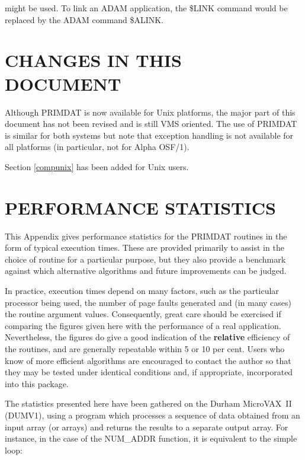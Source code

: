 \documentclass[11pt,nolof]{starlink}
\providecommand{\name}[1]{\mbox{#1}}
\begin{document}

might be used.
To link an \name{ADAM} application, the \name{\$LINK} command would be
replaced by the \name{ADAM} command \name{\$ALINK}.

\section{CHANGES IN THIS DOCUMENT}
Although PRIMDAT is now available for Unix platforms, the major part of this
document has not been revised and is still VMS oriented.
The use of PRIMDAT is similar for both systems but note that exception
handling is not available for all platforms (in particular, not for
Alpha OSF/1).

Section \ref{compunix} has been added for Unix users.

\appendix

\newpage

\section{PERFORMANCE STATISTICS}

\label{appendix:statistics}

This Appendix gives performance statistics for the \name{PRIMDAT} routines
in the form of typical execution times.
These are provided primarily to assist in the choice of routine for a
particular purpose, but they also provide a benchmark against which
alternative algorithms and future improvements can be judged.

In practice, execution times depend on many factors, such as the
particular processor being used, the number of page faults generated
and (in many cases) the routine argument values.
Consequently, great care should be exercised if comparing the figures given
here with the performance of a real application.
Nevertheless, the figures do give a good indication of the \textbf{relative}
efficiency of the routines, and are generally repeatable within 5 or 10 per
cent.
Users who know of more efficient algorithms are encouraged to contact the
author so that they may be tested under identical conditions and, if
appropriate, incorporated into this package.

The statistics presented here have been gathered on the Durham
\name{MicroVAX}~II (\name{DUMV1}), using a program which processes a
sequence of data obtained from an input array (or arrays) and returns the
results to a separate output array.
For instance, in the case of the \name{NUM\_ADDR} function, it is equivalent
to the simple loop:
\end{document}
